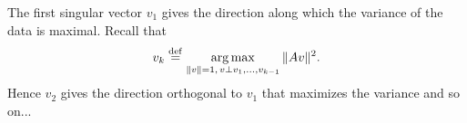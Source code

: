 \documentclass[11pt,nocut]{article}
\begin{document}
The first singular vector $v_1$ gives the direction along which the variance of the data is maximal. Recall that
\begin{equation}
	v_{k} \overset{\rm def}{=} \operatorname*{arg\,max}_{\|v\| = 1, \, v \perp v_1, \dots, v_{k-1}} \| A v \|^2.
\end{equation}
Hence $v_2$ gives the direction orthogonal to $v_1$ that maximizes the variance and so on...

\vspace{1cm}
\centerline{}

%
%
\end{document}
